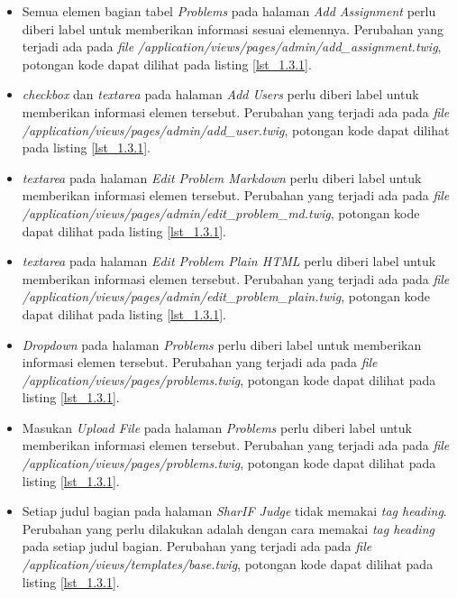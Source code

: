 \begin{itemize}
	\item Semua elemen bagian tabel \textit{Problems} pada halaman \textit{Add Assignment} perlu diberi label untuk memberikan informasi sesuai elemennya. Perubahan yang terjadi ada pada \textit{file} \textit{/application/views/pages/admin/add\_assignment.twig}, potongan kode dapat dilihat pada listing \ref{lst_1.3.1}.

	\item \textit{checkbox} dan \textit{textarea} pada halaman \textit{Add Users} perlu diberi label untuk memberikan informasi elemen tersebut. Perubahan yang terjadi ada pada \textit{file} \textit{/application/views/pages/admin/add\_user.twig}, potongan kode dapat dilihat pada listing \ref{lst_1.3.1}.

	\item \textit{textarea} pada halaman \textit{Edit Problem Markdown} perlu diberi label untuk memberikan informasi elemen tersebut. Perubahan yang terjadi ada pada \textit{file} \textit{/application/views/pages/admin/edit\_problem\_md.twig}, potongan kode dapat dilihat pada listing \ref{lst_1.3.1}.

	\item \textit{textarea} pada halaman \textit{Edit Problem Plain HTML} perlu diberi label untuk memberikan informasi elemen tersebut. Perubahan yang terjadi ada pada \textit{file} \textit{/application/views/pages/admin/edit\_problem\_plain.twig}, potongan kode dapat dilihat pada listing \ref{lst_1.3.1}.
	
	\item \textit{Dropdown} pada halaman \textit{Problems} perlu diberi label untuk memberikan informasi elemen tersebut. Perubahan yang terjadi ada pada \textit{file} \textit{/application/views/pages/problems.twig}, potongan kode dapat dilihat pada listing \ref{lst_1.3.1}.

	\item Masukan \textit{Upload File} pada halaman \textit{Problems} perlu diberi label untuk memberikan informasi elemen tersebut. Perubahan yang terjadi ada pada \textit{file} \textit{/application/views/pages/problems.twig}, potongan kode dapat dilihat pada listing \ref{lst_1.3.1}.
	
	\item Setiap judul bagian pada halaman \textit{SharIF Judge} tidak memakai \textit{tag heading}. Perubahan yang perlu dilakukan adalah dengan cara memakai \textit{tag heading} pada setiap judul bagian.
	Perubahan yang terjadi ada pada \textit{file} \textit{/application/views/templates/base.twig}, potongan kode dapat dilihat pada listing \ref{lst_1.3.1}.
	

\end{itemize}
